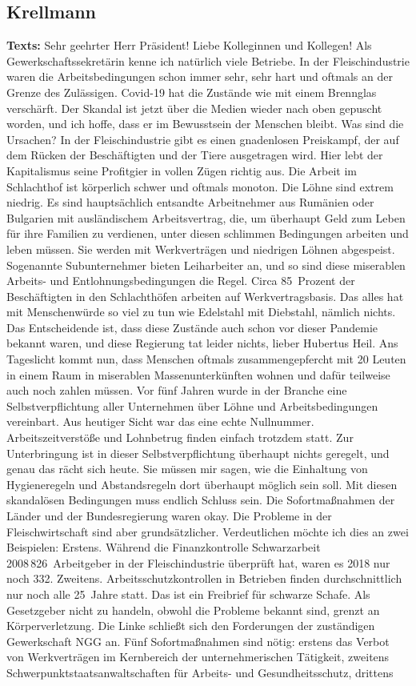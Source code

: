 \documentclass{article}
\begin{document}
\subsection{Krellmann}
\noindent\textbf{Texts:} Sehr geehrter Herr Präsident! Liebe Kolleginnen und Kollegen! Als Gewerkschaftssekretärin kenne ich natürlich viele Betriebe. In der Fleischindustrie waren die Arbeitsbedingungen schon immer sehr, sehr hart und oftmals an der Grenze des Zulässigen. Covid-19 hat die Zustände wie mit einem Brennglas verschärft. Der Skandal ist jetzt über die Medien wieder nach oben gepuscht worden, und ich hoffe, dass er im Bewusstsein der Menschen bleibt.  Was sind die Ursachen? In der Fleischindustrie gibt es einen gnadenlosen Preiskampf, der auf dem Rücken der Beschäftigten und der Tiere ausgetragen wird. Hier lebt der Kapitalismus seine Profitgier in vollen Zügen richtig aus. Die Arbeit im Schlachthof ist körperlich schwer und oftmals monoton. Die Löhne sind extrem niedrig. Es sind hauptsächlich entsandte Arbeitnehmer aus Rumänien oder Bulgarien mit ausländischem Arbeitsvertrag, die, um überhaupt Geld zum Leben für ihre Familien zu verdienen, unter diesen schlimmen Bedingungen arbeiten und leben müssen. Sie werden mit Werkverträgen und niedrigen Löhnen abgespeist. Sogenannte Subunternehmer bieten Leiharbeiter an, und so sind diese miserablen Arbeits- und Entlohnungsbedingungen die Regel. Circa 85 Prozent der Beschäftigten in den Schlachthöfen arbeiten auf Werkvertragsbasis. Das alles hat mit Menschenwürde so viel zu tun wie Edelstahl mit Diebstahl, nämlich nichts.  Das Entscheidende ist, dass diese Zustände auch schon vor dieser Pandemie bekannt waren, und diese Regierung tat leider nichts, lieber Hubertus Heil. Ans Tageslicht kommt nun, dass Menschen oftmals zusammengepfercht mit 20 Leuten in einem Raum in miserablen Massenunterkünften wohnen und dafür teilweise auch noch zahlen müssen. Vor fünf Jahren wurde in der Branche eine Selbstverpflichtung aller Unternehmen über Löhne und Arbeitsbedingungen vereinbart. Aus heutiger Sicht war das eine echte Nullnummer.  Arbeitszeitverstöße und Lohnbetrug finden einfach trotzdem statt. Zur Unterbringung ist in dieser Selbstverpflichtung überhaupt nichts geregelt, und genau das rächt sich heute. Sie müssen mir sagen, wie die Einhaltung von Hygieneregeln und Abstandsregeln dort überhaupt möglich sein soll. Mit diesen skandalösen Bedingungen muss endlich Schluss sein.  Die Sofortmaßnahmen der Länder und der Bundesregierung waren okay. Die Probleme in der Fleischwirtschaft sind aber grundsätzlicher. Verdeutlichen möchte ich dies an zwei Beispielen: Erstens. Während die Finanzkontrolle Schwarzarbeit 2008 826 Arbeitgeber in der Fleischindustrie überprüft hat, waren es 2018 nur noch 332. Zweitens. Arbeitsschutzkontrollen in Betrieben finden durchschnittlich nur noch alle 25 Jahre statt.  Das ist ein Freibrief für schwarze Schafe. Als Gesetzgeber nicht zu handeln, obwohl die Probleme bekannt sind, grenzt an Körperverletzung. Die Linke schließt sich den Forderungen der zuständigen Gewerkschaft NGG an. Fünf Sofortmaßnahmen sind nötig: erstens das Verbot von Werkverträgen im Kernbereich der unternehmerischen Tätigkeit,  zweitens Schwerpunktstaatsanwaltschaften für Arbeits- und Gesundheitsschutz,  drittens 
\end{document}

